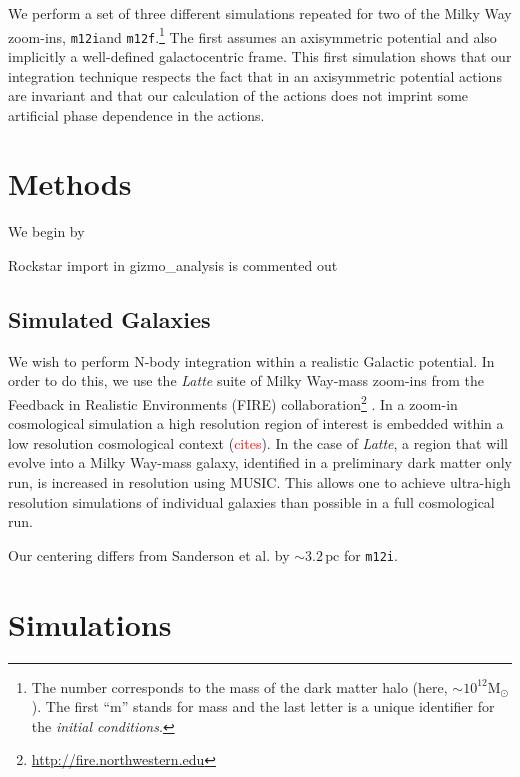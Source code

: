 \documentclass[twocolumn]{aastex62}
\newcommand{\Gus}[1]{\textcolor{red}{#1}}
\newcommand{\Msun}{\text{M}_\odot}
\newcommand{\pc}{\text{pc}}
\newcommand{\mi}{\texttt{m12i}}
\newcommand{\mf}{\texttt{m12f}}
\begin{document}
We perform a set of three different simulations repeated for two of the Milky
Way zoom-ins, \mi and \mf.\footnote{The number corresponds to the mass of the
dark matter halo (here, $\sim 10^{12} \Msun$). The first ``m'' stands for
mass and the last letter is a unique identifier for the {\em initial
conditions}.} The first assumes an axisymmetric potential and also implicitly
a well-defined galactocentric frame. This first simulation shows that our
integration technique respects the fact that in an axisymmetric potential
actions are invariant and that our calculation of the actions does not
imprint some artificial phase dependence in the actions.


\section{Methods} \label{sec:methods}
We begin by 

Rockstar import in gizmo_analysis is commented out

\subsection{Simulated Galaxies} \label{ssec:fire}
We wish to perform N-body integration within a realistic Galactic potential.
In order to do this, we use the {\em Latte} suite of Milky Way-mass zoom-ins
from the Feedback in Realistic Environments (FIRE)
collaboration\footnote{\url{http://fire.northwestern.edu}}
\citep{2016ApJ...827L..23W,2018MNRAS.480..800H}. In a zoom-in cosmological
simulation a high resolution region of interest is embedded within a low
resolution cosmological context (\Gus{cites}). In the case of {\em Latte}, a
region that will evolve into a Milky Way-mass galaxy, identified in a
preliminary dark matter only run, is increased in resolution using MUSIC.
This allows one to achieve ultra-high resolution simulations of individual
galaxies than possible in a full cosmological run.

Our centering differs from Sanderson et al. by $\sim3.2\,\pc$ for \mi.


\section{Simulations}


\end{document}
